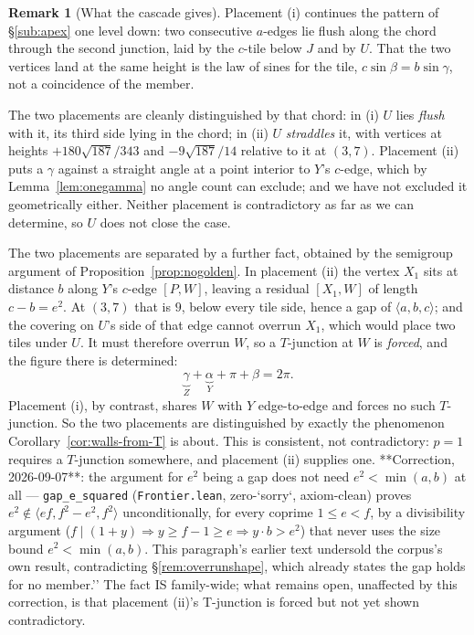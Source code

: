 \documentclass[11pt,reqno]{amsart}
\theoremstyle{plain}
\theoremstyle{definition}
\newtheorem{remark}[theorem]{Remark}
\begin{document}
\begin{remark}[What the cascade gives]\label{rem:cascade}
Placement (i) continues the pattern of \S\ref{sub:apex} one level down: two consecutive $a$-edges lie
flush along the chord through the second junction, laid by the $c$-tile below $J$ and by $U$. That the
two vertices land at the same height is the law of sines for the tile, $c\sin\beta=b\sin\gamma$, not a
coincidence of the member.

The two placements are cleanly distinguished by that chord: in (i) $U$ lies \emph{flush} with it,
its third side lying in the chord; in (ii) $U$ \emph{straddles} it, with vertices at heights
$+180\sqrt{187}/343$ and $-9\sqrt{187}/14$ relative to it at $(3,7)$. Placement (ii) puts a $\gamma$
against a straight angle at a point interior to $Y$'s $c$-edge, which by Lemma~\ref{lem:onegamma} no
angle count can exclude; and we have not excluded it geometrically either. Neither placement is
contradictory as far as we can determine, so $U$ does not close the case.

The two placements are separated by a further fact, obtained by the semigroup argument of
Proposition~\ref{prop:nogolden}. In placement (ii) the vertex $X_1$ sits at distance $b$ along $Y$'s
$c$-edge $[P,W]$, leaving a residual $[X_1,W]$ of length $c-b=e^{2}$. At $(3,7)$ that is $9$, below
every tile side, hence a gap of $\langle a,b,c\rangle$; and the covering on $U$'s side of that edge
cannot overrun $X_1$, which would place two tiles under $U$. It must therefore overrun $W$, so a
$T$-junction at $W$ is \emph{forced}, and the figure there is determined:
\[
\underbrace{\gamma}_{Z}+\underbrace{\alpha}_{Y}+\pi+\beta=2\pi .
\]
Placement (i), by contrast, shares $W$ with $Y$ edge-to-edge and forces no such $T$-junction. So the
two placements are distinguished by exactly the phenomenon Corollary~\ref{cor:walls-from-T} is about.
This is consistent, not contradictory: $p=1$ requires a $T$-junction somewhere, and placement (ii)
supplies one. **Correction, 2026-09-07**: the argument for $e^{2}$ being a gap does not need
$e^{2}<\min(a,b)$ at all --- \texttt{gap\_e\_squared} (\texttt{Frontier.lean}, zero-`sorry`,
axiom-clean) proves $e^2\notin\langle ef,f^2{-}e^2,f^2\rangle$ unconditionally, for every coprime
$1\le e<f$, by a divisibility argument ($f\mid(1{+}y)\Rightarrow y\ge f{-}1\ge e\Rightarrow
y\cdot b>e^2$) that never uses the size bound $e^2<\min(a,b)$. This paragraph's earlier text
undersold the corpus's own result, contradicting \S\ref{rem:overrunshape}, which already states
the gap holds for no member.'' The fact IS family-wide; what remains open, unaffected by this
correction, is that placement (ii)'s T-junction is forced but not yet shown contradictory.


\end{remark}
\end{document}
